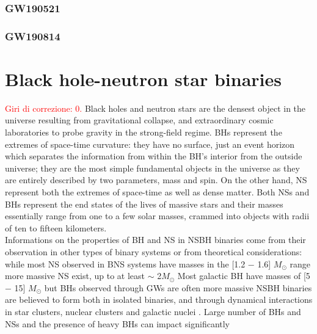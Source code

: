 \documentclass[binding=0.6cm, LaM]{sapthesis}
\newcommand{\fpg}[1]{\textcolor{red}{#1} }
\begin{document}
\subsection{GW190521}

\subsection{GW190814}


\chapter{Black hole-neutron star binaries}
\label{neutronhole}
\fpg{Giri di correzione: 0.}%
        Black holes and neutron stars are the densest object in the universe resulting from gravitational collapse,
        and extraordinary cosmic laboratories to probe gravity in the strong-field regime.
        BHs represent the extremes of space-time curvature:
        they have no surface, just an event horizon which separates the information
        from within the BH’s interior from the outside universe;
        they are the most simple fundamental objects in the universe
        as they are entirely described by two parameters, mass and spin.
        On the other hand, NS represent both the extremes of space-time as well as dense matter.
        Both NSs and BHs represent the end states of the lives of massive stars
        and their masses essentially range from one to a few solar masses,
        crammed into objects with radii of ten to fifteen kilometers. \\
        Informations on the properties of BH and NS in NSBH binaries come from
        their observation in other types of binary systems or from theoretical considerations:
        while most NS observed in BNS systems have masses in the [1.2 − 1.6] $M_{\odot}$ range %
        more massive NS exist, up to at least $\sim$ 2$M_{\odot}$  %
        Most galactic BH have masses of [5 − 15] $M_{\odot}$  %
        but BHs observed through GWs are often more massive %
        NSBH binaries are believed to form both in isolated binaries,
        and through dynamical interactions in star clusters, nuclear clusters and galactic nuclei \cite{194}.
        Large number of BHs and NSs and the presence of heavy BHs can impact significantly
\end{document}
